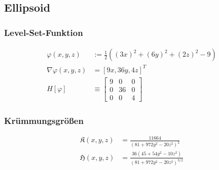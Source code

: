   \subsection{Ellipsoid}
    \label{heineC}
    
    \subsubsection{Level-Set-Funktion}
      \begin{align}
        \varphi(x,y,z) &:= \frac{1}{2}\left( (3x)^{2} + (6y)^{2} + (2z)^{2} - 9 \right) \\
        \nabla\varphi(x,y,z) &= \left[ 9x, 36y, 4z \right]^{T} \\
        H[\varphi] &\equiv \begin{bmatrix} 9 & 0 & 0 \\
                                             0 & 36 & 0 \\
                                             0 & 0 & 4 \end{bmatrix}
      \end{align}

     \subsubsection{Krümmungsgrößen}
      \begin{align}
        \mathfrak{K}(x,y,z) &= \frac{11664}{(81+972y^{2}-20z^{2})^{2}} \\
        \mathfrak{H}(x,y,z) &= \frac{36 \left(45+54 y^2-10 z^2\right)}{\left(81+972 y^2-20 z^2\right)^{3/2}}
      \end{align}
